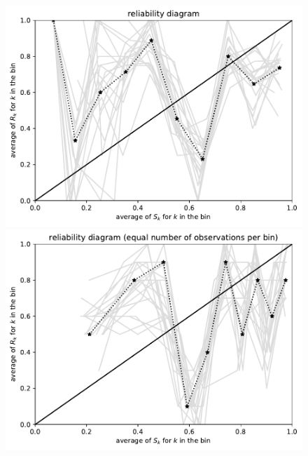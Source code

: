 \documentclass{article}
\begin{document}
\begin{figure}
\begin{centering}
\vspace{\vertsep}

\parbox{\imsize}{\includegraphics[width=\imsize]
                {./codes/unweighted/100_10_2_1/equiprob.pdf}}
\quad\quad
\parbox{\imsize}{\includegraphics[width=\imsize]
                {./codes/unweighted/100_10_2_1/equisamp.pdf}}

\vspace{\vertsep}


\end{centering}
\end{figure}
\end{document}
